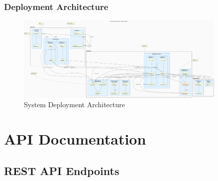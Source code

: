 \documentclass[12pt,a4paper]{article}
\begin{document}
\subsubsection{Deployment Architecture}

\begin{figure}[H]
\centering
\includegraphics[width=0.9\textwidth]{diagrams/deployment_diagram.svg}
\caption{System Deployment Architecture}
\label{fig:deployment-diagram}
\end{figure}

\section{API Documentation}

\subsection{REST API Endpoints}
\end{document}
